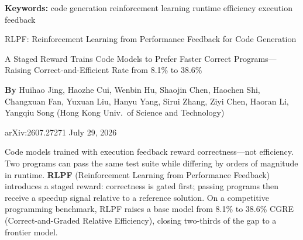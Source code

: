 \documentclass[10pt,twocolumn]{article}
\begin{document}
\setlength{\parindent}{0pt}
\setlength{\parskip}{4pt}

{\small\color{keywordgray}\textbf{Keywords:}
  code generation \textbullet{}
  reinforcement learning \textbullet{}
  runtime efficiency \textbullet{}
  execution feedback}\par\vspace{4pt}

{\LARGE\bfseries\raggedright
  RLPF: Reinforcement Learning from Performance
  Feedback for Code Generation}\par\vspace{4pt}

{\large\itshape\raggedright
  A Staged Reward Trains Code Models to Prefer Faster Correct
  Programs---Raising Correct-and-Efficient Rate from 8.1\% to 38.6\%}\par\vspace{6pt}

{\small\textbf{By} Huihao Jing, Haozhe Cui, Wenbin Hu, Shaojin Chen,
  Haochen Shi, Changxuan Fan, Yuxuan Liu, Hanyu Yang, Sirui Zhang,
  Ziyi Chen, Haoran Li, Yangqiu Song
  (Hong Kong Univ.\ of Science and Technology)}\par\vspace{2pt}

{\small\color{keywordgray}arXiv:2607.27271 \textbullet{} July 29, 2026}
\par\vspace{2pt}\noindent{\color{rulered}\rule{\columnwidth}{0.6pt}}\vspace{6pt}

Code models trained with execution feedback reward correctness---not
efficiency. Two programs can pass the same test suite while differing by
orders of magnitude in runtime. \textbf{RLPF} (Reinforcement Learning
from Performance Feedback) introduces a staged reward: correctness is
gated first; passing programs then receive a speedup signal relative to a
reference solution. On a competitive programming benchmark, RLPF raises a
base model from 8.1\% to 38.6\% CGRE (Correct-and-Graded Relative
Efficiency), closing two-thirds of the gap to a frontier model.
\end{document}
